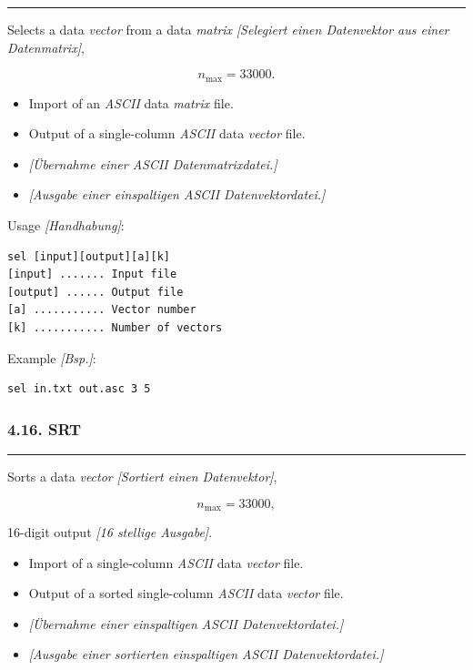 \documentclass[
]{article}
\begin{document}
\begin{center}\rule{0.5\linewidth}{0.5pt}\end{center}

Selects a data \emph{vector} from a data \emph{matrix}
\emph{{[}Selegiert einen Datenvektor aus einer Datenmatrix{]}},

\[n_{\max} = 33000.\]

\begin{itemize}
\item
  Import of an \emph{ASCII} data \emph{matrix} file.
\item
  Output of a single-column \emph{ASCII} data \emph{vector} file.
\item
  \emph{{[}Übernahme einer ASCII Datenmatrixdatei.{]}}
\item
  \emph{{[}Ausgabe einer einspaltigen ASCII Datenvektordatei.{]}}
\end{itemize}

Usage \emph{{[}Handhabung{]}}:

\begin{verbatim}
sel [input][output][a][k] 
[input] ....... Input file 
[output] ...... Output file 
[a] ........... Vector number 
[k] ........... Number of vectors
\end{verbatim}

Example \emph{{[}Bsp.{]}}:

\begin{verbatim}
sel in.txt out.asc 3 5
\end{verbatim}

\hypertarget{srt}{%
\subsubsection{4.16. SRT}\label{srt}}

\begin{center}\rule{0.5\linewidth}{0.5pt}\end{center}

Sorts a data \emph{vector} \emph{{[}Sortiert einen Datenvektor{]}},

\[n_{\max} = 33000,\]

16-digit output \emph{{[}16 stellige Ausgabe{]}}.

\begin{itemize}
\item
  Import of a single-column \emph{ASCII} data \emph{vector} file.
\item
  Output of a sorted single-column \emph{ASCII} data \emph{vector} file.
\item
  \emph{{[}Übernahme einer einspaltigen ASCII Datenvektordatei.{]}}
\item
  \emph{{[}Ausgabe einer sortierten einspaltigen ASCII
  Datenvektordatei.{]}}
\end{itemize}
\end{document}
